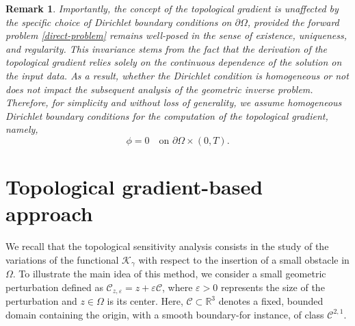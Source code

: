 \documentclass[a4paper,12pt,reqno,natbib]{amsart}
\newtheorem{remark}[theorem]{Remark}
\begin{document}
\begin{remark}
Importantly, the concept of the topological gradient is unaffected by the specific choice of Dirichlet boundary conditions on \( \partial\Omega \), provided the forward problem \eqref{direct-problem} remains well-posed in the sense of existence, uniqueness, and regularity. This invariance stems from the fact that the derivation of the topological gradient relies solely on the continuous dependence of the solution on the input data. As a result, whether the Dirichlet condition is homogeneous or not does not impact the subsequent analysis of the geometric inverse problem. Therefore, for simplicity and without loss of generality, we assume homogeneous Dirichlet boundary conditions for the computation of the topological gradient, namely,
\[
\phi = 0 \quad \text{on } \partial\Omega \times (0, T).
\]
\end{remark}


\section{Topological gradient-based approach}\label{sec:gradient-topologique}


We recall that the topological sensitivity analysis consists in the study of the variations of the functional $\mathcal{K}_\gamma$ with respect to the insertion of a small obstacle in $\Omega$. To illustrate the main idea of this method, we consider a small geometric perturbation defined as $\mathcal{C}_{z,\varepsilon}=z+\varepsilon\mathcal{C}$, where $\varepsilon>0$ represents the size of the perturbation and $z\in\Omega$ is its center. Here, \( \mathcal{C} \subset \mathbb{R}^3 \) denotes a fixed, bounded domain containing the origin, with a smooth boundary-for instance, of class \( \mathcal{C}^{2,1} \).
\end{document}
